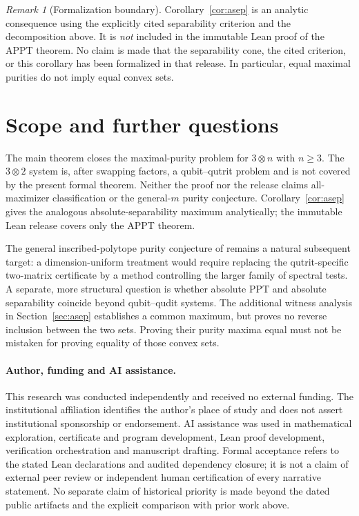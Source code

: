 \documentclass[11pt]{article}
\theoremstyle{remark}\newtheorem{remark}[theorem]{Remark}
\begin{document}
\begin{remark}[Formalization boundary]
Corollary~\ref{cor:asep} is an analytic consequence using the explicitly cited separability criterion and the decomposition above. It is \emph{not} included in the immutable Lean proof of the APPT theorem. No claim is made that the separability cone, the cited criterion, or this corollary has been formalized in that release. In particular, equal maximal purities do not imply equal convex sets.
\end{remark}

\section{Scope and further questions}
The main theorem closes the maximal-purity problem for $3\otimes n$ with $n\geq3$. The $3\otimes2$ system is, after swapping factors, a qubit--qutrit problem and is not covered by the present formal theorem. Neither the proof nor the release claims all-maximizer classification or the general-$m$ purity conjecture. Corollary~\ref{cor:asep} gives the analogous absolute-separability maximum analytically; the immutable Lean release covers only the APPT theorem.

The general inscribed-polytope purity conjecture of \cite{AKW} remains a natural subsequent target: a dimension-uniform treatment would require replacing the qutrit-specific two-matrix certificate by a method controlling the larger family of spectral tests. A separate, more structural question is whether absolute PPT and absolute separability coincide beyond qubit--qudit systems. The additional witness analysis in Section~\ref{sec:asep} establishes a common maximum, but proves no reverse inclusion between the two sets. Proving their purity maxima equal must not be mistaken for proving equality of those convex sets.

\paragraph{Author, funding and AI assistance.}
This research was conducted independently and received no external funding. The institutional affiliation identifies the author's place of study and does not assert institutional sponsorship or endorsement. AI assistance was used in mathematical exploration, certificate and program development, Lean proof development, verification orchestration and manuscript drafting. Formal acceptance refers to the stated Lean declarations and audited dependency closure; it is not a claim of external peer review or independent human certification of every narrative statement. No separate claim of historical priority is made beyond the dated public artifacts and the explicit comparison with prior work above.
\end{document}
